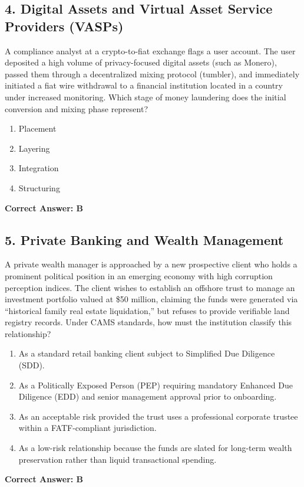 \documentclass[11pt,a4paper]{article}
\begin{document}
	\subsection{4. Digital Assets and Virtual Asset Service Providers (VASPs)}
	A compliance analyst at a crypto-to-fiat exchange flags a user account. The user deposited a high volume of privacy-focused digital assets (such as Monero), passed them through a decentralized mixing protocol (tumbler), and immediately initiated a fiat wire withdrawal to a financial institution located in a country under increased monitoring. Which stage of money laundering does the initial conversion and mixing phase represent?
	\begin{enumerate}[label=\Alph*.]
		\item Placement
		\item Layering
		\item Integration
		\item Structuring
	\end{enumerate}
	\textbf{Correct Answer: B}
	
	\subsection{5. Private Banking and Wealth Management}
	A private wealth manager is approached by a new prospective client who holds a prominent political position in an emerging economy with high corruption perception indices. The client wishes to establish an offshore trust to manage an investment portfolio valued at \$50 million, claiming the funds were generated via ``historical family real estate liquidation,'' but refuses to provide verifiable land registry records. Under CAMS standards, how must the institution classify this relationship?
	\begin{enumerate}[label=\Alph*.]
		\item As a standard retail banking client subject to Simplified Due Diligence (SDD).
		\item As a Politically Exposed Person (PEP) requiring mandatory Enhanced Due Diligence (EDD) and senior management approval prior to onboarding.
		\item As an acceptable risk provided the trust uses a professional corporate trustee within a FATF-compliant jurisdiction.
		\item As a low-risk relationship because the funds are slated for long-term wealth preservation rather than liquid transactional spending.
	\end{enumerate}
	\textbf{Correct Answer: B}
	
\end{document}
